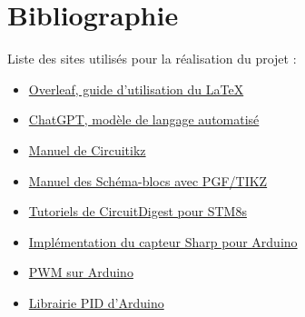 \documentclass[11pt,a4paper]{article}
\begin{document}
\section{Bibliographie}
Liste des sites utilisés pour la réalisation du projet :
\begin{itemize}
\item \href{https://www.overleaf.com/learn}{Overleaf, guide d'utilisation du \LaTeX{}}
\item \href{https://chat.openai.com/chat}{ChatGPT, modèle de langage automatisé}
\item \href{https://ctan.mines-albi.fr/graphics/pgf/contrib/circuitikz/doc/circuitikzmanual.pdf}{Manuel de Circuitikz}
\item \href{https://sciences-indus-cpge.papanicola.info/IMG/pdf/schemabloc.pdf}{Manuel des Schéma-blocs avec PGF/TIKZ}
\item \href{https://circuitdigest.com/microcontroller-projects/getting-started-with-stm8s-using-stvd-and-cosmic-c-compiler}{Tutoriels de CircuitDigest pour STM8s}
\item \href{https://www.instructables.com/How-to-Use-the-Sharp-IR-Sensor-GP2Y0A41SK0F-Arduin/}{Implémentation du capteur Sharp pour Arduino}
\item \href{https://passionelectronique.fr/pwm-arduino/}{PWM sur Arduino}
\item \href{https://playground.arduino.cc/Code/PIDLibrary/}{Librairie PID d'Arduino}
\end{itemize}
\end{document}
